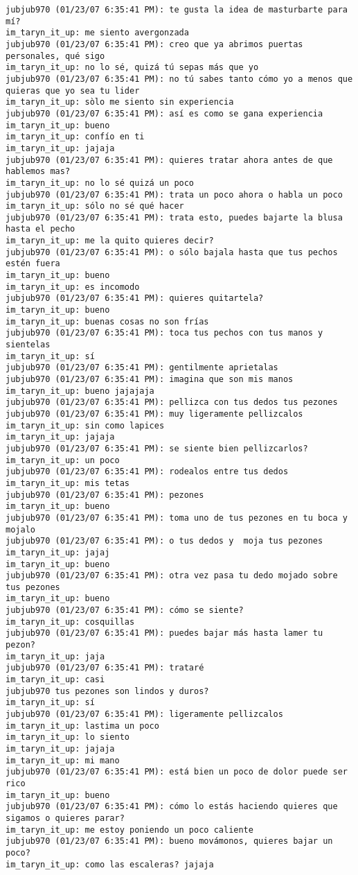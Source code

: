 \begin{verbatim}
jubjub970 (01/23/07 6:35:41 PM): te gusta la idea de masturbarte para mí?
im_taryn_it_up: me siento avergonzada
jubjub970 (01/23/07 6:35:41 PM): creo que ya abrimos puertas personales, qué sigo
im_taryn_it_up: no lo sé, quizá tú sepas más que yo
jubjub970 (01/23/07 6:35:41 PM): no tú sabes tanto cómo yo a menos que quieras que yo sea tu lider 
im_taryn_it_up: sòlo me siento sin experiencia
jubjub970 (01/23/07 6:35:41 PM): así es como se gana experiencia
im_taryn_it_up: bueno
im_taryn_it_up: confío en ti
im_taryn_it_up: jajaja
jubjub970 (01/23/07 6:35:41 PM): quieres tratar ahora antes de que hablemos mas?
im_taryn_it_up: no lo sé quizá un poco
jubjub970 (01/23/07 6:35:41 PM): trata un poco ahora o habla un poco
im_taryn_it_up: sólo no sé qué hacer
jubjub970 (01/23/07 6:35:41 PM): trata esto, puedes bajarte la blusa hasta el pecho
im_taryn_it_up: me la quito quieres decir?
jubjub970 (01/23/07 6:35:41 PM): o sólo bajala hasta que tus pechos estén fuera
im_taryn_it_up: bueno
im_taryn_it_up: es incomodo
jubjub970 (01/23/07 6:35:41 PM): quieres quitartela?
im_taryn_it_up: bueno
im_taryn_it_up: buenas cosas no son frías
jubjub970 (01/23/07 6:35:41 PM): toca tus pechos con tus manos y sientelas
im_taryn_it_up: sí
jubjub970 (01/23/07 6:35:41 PM): gentilmente aprietalas
jubjub970 (01/23/07 6:35:41 PM): imagina que son mis manos
im_taryn_it_up: bueno jajajaja
jubjub970 (01/23/07 6:35:41 PM): pellizca con tus dedos tus pezones
jubjub970 (01/23/07 6:35:41 PM): muy ligeramente pellizcalos
im_taryn_it_up: sin como lapices
im_taryn_it_up: jajaja
jubjub970 (01/23/07 6:35:41 PM): se siente bien pellizcarlos?
im_taryn_it_up: un poco
jubjub970 (01/23/07 6:35:41 PM): rodealos entre tus dedos
im_taryn_it_up: mis tetas
jubjub970 (01/23/07 6:35:41 PM): pezones
im_taryn_it_up: bueno
jubjub970 (01/23/07 6:35:41 PM): toma uno de tus pezones en tu boca y mojalo
jubjub970 (01/23/07 6:35:41 PM): o tus dedos y  moja tus pezones
im_taryn_it_up: jajaj
im_taryn_it_up: bueno
jubjub970 (01/23/07 6:35:41 PM): otra vez pasa tu dedo mojado sobre tus pezones 
im_taryn_it_up: bueno
jubjub970 (01/23/07 6:35:41 PM): cómo se siente?
im_taryn_it_up: cosquillas
jubjub970 (01/23/07 6:35:41 PM): puedes bajar más hasta lamer tu pezon?
im_taryn_it_up: jaja
jubjub970 (01/23/07 6:35:41 PM): trataré
im_taryn_it_up: casi
jubjub970 tus pezones son lindos y duros?
im_taryn_it_up: sí
jubjub970 (01/23/07 6:35:41 PM): ligeramente pellizcalos
im_taryn_it_up: lastima un poco
im_taryn_it_up: lo siento
im_taryn_it_up: jajaja
im_taryn_it_up: mi mano
jubjub970 (01/23/07 6:35:41 PM): está bien un poco de dolor puede ser rico
im_taryn_it_up: bueno
jubjub970 (01/23/07 6:35:41 PM): cómo lo estás haciendo quieres que sigamos o quieres parar?
im_taryn_it_up: me estoy poniendo un poco caliente
jubjub970 (01/23/07 6:35:41 PM): bueno movámonos, quieres bajar un poco?
im_taryn_it_up: como las escaleras? jajaja
\end{verbatim}
